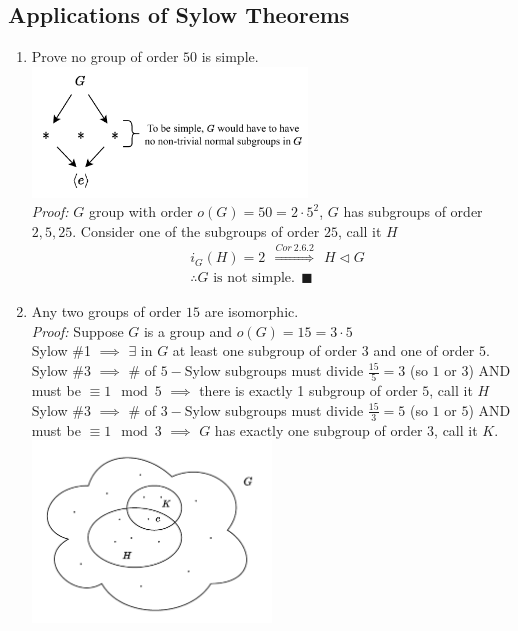 \subsection*{Applications of Sylow Theorems}
\begin{enumerate}
    \item Prove no group of order $50$ is simple. \steezybreak\\
    \includegraphics[width=0.575\textwidth]{Figures/order50_no_normal.pdf} \steezybreak\\
    \textit{Proof:} $G$ group with order $o(G)=50=2\cdot 5^2$, $G$ has subgroups of order $2, 5, 25$. Consider one of the subgroups of order $25$, call it $H$
    \begin{align}
        &i_G(H)=2 \ \ \overset{Cor \ 2.6.2}{\Longrightarrow} \ \  H\triangleleft G \nonumber \\
        &\therefore G \text{ is not simple.} \ \ \blacksquare \nonumber
    \end{align}
    \item Any two groups of order $15$ are isomorphic. \steezybreak\\
    \textit{Proof: } Suppose $G$ is a group and $o(G)=15=3\cdot 5$\\
    Sylow \#1 $\implies$ $\exists$ in $G$ at least one subgroup of order $3$ and one of order $5$.\\
    Sylow \#3 $\implies$ \# of $5-$Sylow subgroups must divide $\frac{15}{5}=3$ (so $1$ or $3$) AND must be $\equiv 1\mod 5$ $\implies$ there is exactly 1 subgroup of order $5$, call it $H$\\
    Sylow \#3 $\implies$ \# of $3-$Sylow subgroups must divide $\frac{15}{3}=5$ (so $1$ or $5$) AND must be $\equiv 1\mod 3$ $\implies$ $G$ has exactly one subgroup of order $3$, call it $K$.\\
    \includegraphics[width=0.5\textwidth]{Figures/order15_subgroups.pdf}\\

\end{enumerate}
